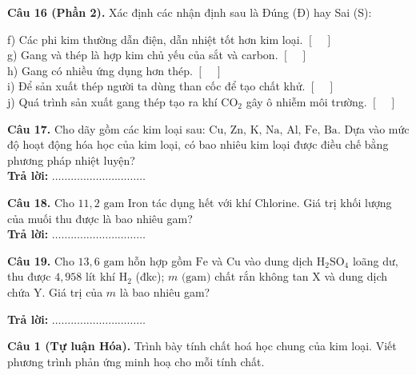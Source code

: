 \documentclass{article}
\begin{document}
\fontsize{24}{32}\selectfont
\textbf{Câu 16 (Phần 2).} Xác định các nhận định sau là Đúng (Đ) hay Sai (S):
\vspace{12pt}

f) Các phi kim thường dẫn điện, dẫn nhiệt tốt hơn kim loại. \hfill $[\quad]$\\[10pt]
g) Gang và thép là hợp kim chủ yếu của sắt và carbon. \hfill $[\quad]$\\[10pt]
h) Gang có nhiều ứng dụng hơn thép. \hfill $[\quad]$\\[10pt]
i) Để sản xuất thép người ta dùng than cốc để tạo chất khử. \hfill $[\quad]$\\[10pt]
j) Quá trình sản xuất gang thép tạo ra khí $\text{CO}_2$ gây ô nhiễm môi trường. \hfill $[\quad]$
\vspace*{\fill}
\newpage

\fontsize{26}{34}\selectfont
\textbf{Câu 17.} Cho dãy gồm các kim loại sau: $\text{Cu, Zn, K, Na, Al, Fe, Ba}$. Dựa vào mức độ hoạt động hóa học của kim loại, có bao nhiêu kim loại được điều chế bằng phương pháp nhiệt luyện?\\
\textbf{Trả lời:} $\dots\dots\dots\dots\dots\dots\dots\dots\dots\dots$

\vspace*{\fill}

\textbf{Câu 18.} Cho $11,2\text{ gam}$ Iron tác dụng hết với khí Chlorine. Giá trị khối lượng của muối thu được là bao nhiêu gam?\\
\textbf{Trả lời:} $\dots\dots\dots\dots\dots\dots\dots\dots\dots\dots$
\vspace*{\fill}
\newpage

\fontsize{26}{34}\selectfont
\textbf{Câu 19.} Cho $13,6\text{ gam}$ hỗn hợp gồm $\text{Fe}$ và $\text{Cu}$ vào dung dịch $\text{H}_2\text{SO}_4$ loãng dư, thu được $4,958\text{ lít}$ khí $\text{H}_2$ (đkc); $m\text{ (gam)}$ chất rắn không tan X và dung dịch chứa Y. Giá trị của $m$ là bao nhiêu gam?
\vspace{16pt}

\textbf{Trả lời:} $\dots\dots\dots\dots\dots\dots\dots\dots\dots\dots$

\vspace*{\fill}
\newpage

\fontsize{26}{34}\selectfont
\textbf{Câu 1 (Tự luận Hóa).} Trình bày tính chất hoá học chung của kim loại. Viết phương trình phản ứng minh hoạ cho mỗi tính chất.
\vspace*{\fill}
\newpage
\end{document}
